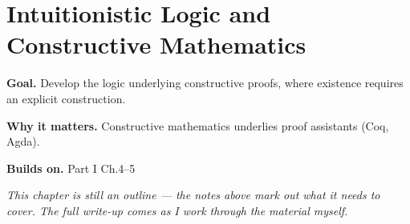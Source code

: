\chapter{Intuitionistic Logic and Constructive Mathematics}
\label{ch:01-mathematical-logic-and-proof-theory-06}

\begin{chapterintro}
\textbf{Goal.} Develop the logic underlying constructive proofs, where existence requires an explicit construction.

\textbf{Why it matters.} Constructive mathematics underlies proof assistants (Coq, Agda).

\textbf{Builds on.} Part I Ch.4–5
\end{chapterintro}

\textit{This chapter is still an outline --- the notes above mark out what it needs to cover. The full write-up comes as I work through the material myself.}
